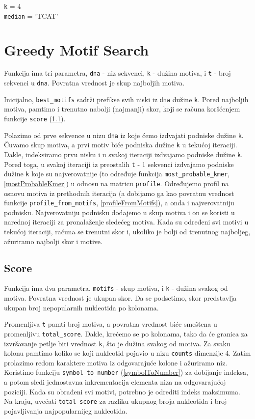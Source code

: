 \noindent \texttt{k} = 4
\\\texttt{median} = 'TCAT'


\section{Greedy Motif Search}

Funkcija ima tri parametra, \texttt{dna} - niz sekvenci, \texttt{k} - dužina motiva, i \texttt{t} - broj sekvenci u \texttt{dna}. Povratna vrednost je skup najboljih motiva.

Inicijalno, \texttt{best\_motifs} sadrži prefikse svih niski iz \texttt{dna} dužine \texttt{k}. Pored najboljih motiva, pamtimo i trenutno nabolji (najmanji) skor, koji se računa koršćenjem funkcije \texttt{score} (\ref{score}). 

Polazimo od prve sekvence u nizu \texttt{dna} iz koje ćemo izdvajati podniske dužine \texttt{k}. Čuvamo skup motiva, a prvi motiv biće podniska dužine \texttt{k} u tekućoj iteraciji. Dakle, indeksiramo prvu nisku i u svakoj iteraciji izdvajamo podniske dužine \texttt{k}. Pored toga, u svakoj iteraciji iz preostalih \texttt{t} - 1 sekvenci izdvajamo podniske dužine \texttt{k} koje su najverovatnije (to određuje funkcija \texttt{most\_probable\_kmer}, \ref{mostProbableKmer}) u odnosu na matricu \texttt{profile}. Određujemo profil na osnovu motiva iz prethodnih iteracija (a dobijamo ga kao povratnu vrednost funkcije \texttt{profile\_from\_motifs}, \ref{profileFromMotifs}), a onda i najverovatniju podnisku. Najverovatniju podnisku dodajemo u skup motiva i on se koristi u narednoj iteraciji za pronalaženje sledećeg motiva. Kada su određeni svi motivi u tekućoj iteraciji, računa se trenutni skor i, ukoliko je bolji od trenutnog najboljeg, ažuriramo najbolji skor i motive.





\subsection{Score}
\label{score}

Funkcija ima dva parametra, \texttt{motifs} - skup motiva, i \texttt{k} - dužina svakog od motiva. Povratna vrednost je ukupan skor. Da se podsetimo, skor predstavlja ukupan broj nepopularnih nukleotida po kolonama.

Promenljiva \texttt{t} pamti broj motiva, a povratna vrednost biće smeštena u promenljivu \texttt{total\_score}. Dakle, krećemo se po kolonama, tako da će granica za izvršavanje petlje biti vrednost \texttt{k}, što je dužina svakog od motiva. Za svaku kolonu pamtimo koliko se koji nukleotid pojavio u nizu \texttt{counts} dimenzije 4. Zatim prolazimo redom karaktere motiva iz odgovarajuće kolone i ažuriramo niz. Koristimo funkciju \texttt{symbol\_to\_number} (\ref{symbolToNumber}) za dobijanje indeksa, a potom sledi jednostavna inkrementacija elementa niza na odgovarajućoj poziciji. Kada su obrađeni svi motivi, potrebno je odrediti indeks maksimuma. Na kraju, uvećati \texttt{total\_score} za razliku ukupnog broja nukleotida i broj pojavljivanja najpopularnijeg nukleotida.

